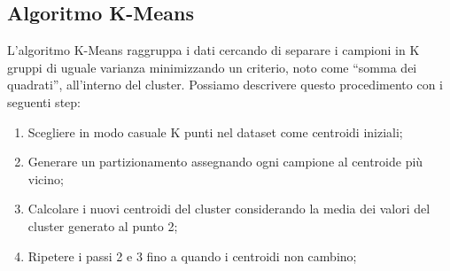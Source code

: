 \documentclass[12pt,oneside]{article}
\begin{document}
    \begin{enumerate}
    \subsection{Algoritmo K-Means}
    \begin{justify}
        L'algoritmo K-Means raggruppa i dati cercando di separare i campioni in K gruppi di uguale varianza minimizzando un criterio, noto come “somma dei quadrati”, all'interno del cluster. Possiamo descrivere questo procedimento con i seguenti step:
        \begin{enumerate}[label=\arabic*)]
            \item Scegliere in modo casuale K punti nel dataset come centroidi iniziali;
            \item Generare un partizionamento assegnando ogni campione al centroide più vicino;
            \item Calcolare i nuovi centroidi del cluster considerando la media dei valori del cluster generato al punto 2;
            \item Ripetere i passi 2 e 3 fino a quando i centroidi non cambino;
        \end{enumerate}
    \end{justify}
    \end{enumerate}
\end{document}
